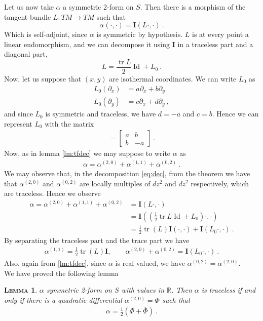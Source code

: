 \documentclass[a4paper,11pt,openright,twoside]{book}
\newcommand{\R}{\mathbb{R}}
\newcommand{\tr}{\operatorname{tr}}
\newcommand{\I}{\mathbf{I}}
\newcommand{\Id}{\operatorname{Id}}
\newcommand{\1}{\mathds{1}}
\theoremstyle{plain}
\newtheorem{lemma}[thm]{\textsc{Lemma}}
\theoremstyle{definition}
\theoremstyle{remark}
\begin{document}
Let us now take $\alpha$ a symmetric 2-form on  $S$. Then there is a morphism of the tangent bundle $L:TM\to TM$ such that 
\[
	\alpha(\cdot ,\cdot ) = \I(L\cdot ,\cdot )
\ . 
\]
Which is self-adjoint, since $\alpha$ is symmetric by hypothesis. 
$L$ is at every point a linear endomorphism, and we can decompose it using $\I$ in a traceless part and a diagonal part,
\[
	L = \frac{\tr L}{2}\Id +L_0
\ . 
\]
Now, let us suppose that $(x,y)$ are isothermal coordinates. We can write $L_0$ as
\begin{align*}
	L_0(\partial_x) &= a \partial_x +b \partial_y\\
	L_0(\partial_y) &= c\partial_x +d\partial_y
\ , 
\end{align*}
and since $L_0$ is symmetric and traceless, we have $d = -a$ and $c = b$. Hence we can represent $L_0$ with the matrix
\begin{align*}
	[L_0] = 
	\begin{bmatrix} a&b \\ b&-a \end{bmatrix} 
\ . 
\end{align*}
Now, as in lemma \ref{lm:tfdec} we may suppose to write $\alpha$ as 
\begin{align}\label{eq:dec}
	\alpha = \alpha^{(2,0)} + \alpha^{(1,1)} + \alpha^{(0,2)}
\ . 
\end{align}
We may observe that, in the decomposition \eqref{eq:dec}, from the theorem we have that $\alpha^{(2,0)}$ and $\alpha^{(0,2)}$ are locally multiples of  $dz^2$ and $d\bar z^2$ respectively, which are traceless. Hence we observe
\begin{align*}
	\alpha = \alpha^{(2,0)} + \alpha^{(1,1)} + \alpha^{(0,2)} &= \I(L\cdot ,\cdot ) \\
		&= \I\left(\left( \tfrac{1}{2}{\tr L}\Id + L_0\right)\cdot ,\cdot \right) \\
		&= \tfrac{1}{2}\tr(L) \I(\cdot ,\cdot ) +\I(L_0 \cdot ,\cdot )
\ . 
\end{align*}
By separating the traceless part and the trace part we have
\begin{align}\label{eq:trthm3}
	\alpha^{(1,1)} = \tfrac{1}{2}\tr(L)\I, \qquad \alpha^{(2,0)}+\alpha^{(0,2)} = \I(L_0\cdot ,\cdot )
\ . 
\end{align}
Also, again from \ref{lm:tfdec}, since $\alpha$ is real valued, we have $\alpha^{(0,2)}=\overline{\alpha^{(2,0)}}$.\\
We have proved the following lemma
\begin{lemma}\label{lm:trsym2form}
	$\alpha$ symmetric 2-form on $S$ with values in $\R$. Then 	$\alpha$ is traceless if and only if there is a quadratic differential $  \alpha^{(2,0)} = \Phi$ such that 
	\begin{align*}
		\alpha = \tfrac{1}{2}\left( \Phi+\overline{\Phi} \right) 
	\ . 
	\end{align*}
\end{lemma}
\end{document}
